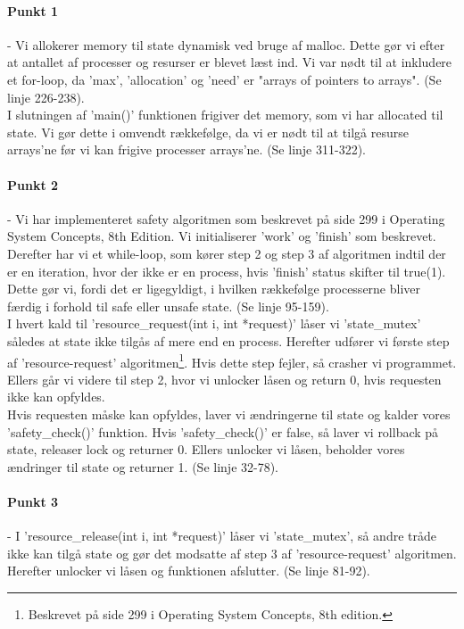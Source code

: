 \paragraph{Punkt 1} - Vi allokerer memory til state dynamisk ved bruge af malloc. Dette gør vi efter at antallet af processer og resurser er blevet læst ind. Vi var nødt til at inkludere et for-loop, da 'max', 'allocation' og 'need' er "arrays of pointers to arrays".  (Se linje 226-238).
\\I slutningen af 'main()' funktionen frigiver det memory, som vi har allocated til state. Vi gør dette i omvendt rækkefølge, da vi er nødt til at tilgå resurse arrays'ne før vi kan frigive processer arrays'ne. (Se linje 311-322).
\paragraph{Punkt 2} - Vi har implementeret safety algoritmen som beskrevet på side 299 i Operating System Concepts, 8th Edition. Vi initialiserer 'work' og 'finish' som beskrevet. Derefter har vi et while-loop, som kører step 2 og step 3 af algoritmen indtil der er en iteration, hvor der ikke er en process, hvis 'finish' status skifter til true(1). Dette gør vi, fordi det er ligegyldigt, i hvilken rækkefølge processerne bliver færdig i forhold til safe eller unsafe state. (Se linje 95-159).
\\I hvert kald til 'resource\_request(int i, int *request)' låser vi 'state\_mutex' således at state ikke tilgås af mere end en process. Herefter udfører vi første step af 'resource-request' algoritmen\footnote{Beskrevet på side 299 i Operating System Concepts, 8th edition.}. Hvis dette step fejler, så crasher vi programmet. Ellers går vi videre til step 2, hvor vi unlocker låsen og return 0, hvis requesten ikke kan opfyldes. 
\\Hvis requesten måske kan opfyldes, laver vi ændringerne til state og kalder vores 'safety\_check()' funktion. Hvis 'safety\_check()' er false, så laver vi rollback på state, releaser lock og returner 0. Ellers unlocker vi låsen, beholder vores ændringer til state og returner 1. (Se linje 32-78).
\paragraph{Punkt 3} - I 'resource\_release(int i, int *request)'  låser vi 'state\_mutex', så andre tråde ikke kan tilgå state og gør det modsatte af step 3 af 'resource-request' algoritmen. Herefter unlocker vi låsen og funktionen afslutter. (Se linje 81-92).
